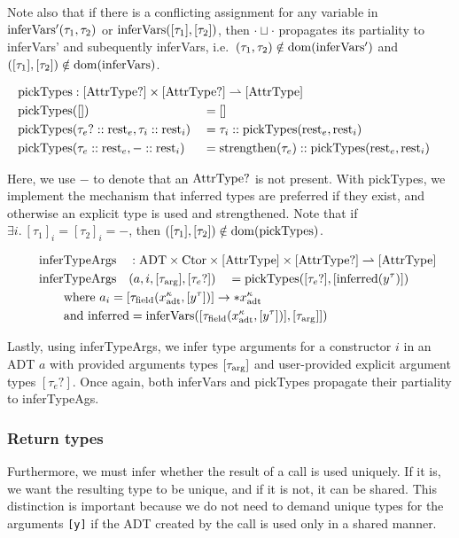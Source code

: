 Note also that if there is a conflicting assignment for any variable in $\mathrm{inferVars'}(\tau_1, \tau_2)$ or $\mathrm{inferVars}([\tau_1], [\tau_2])$, then $\cdot \sqcup \cdot$ propagates its partiality to inferVars' and subequently inferVars, i.e.\ $(\tau_1, \tau_2) \notin \mathrm{dom}(\mathrm{inferVars'})$ and $([\tau_1], [\tau_2]) \notin \mathrm{dom}(\mathrm{inferVars})$.

\newcommand{\pickTypes}{\mathrm{pickTypes}}

\begin{alignat*}{3}
	\pickTypes &: \mathrlap{[\AttrType?] \times [\AttrType?] \rightharpoonup [\AttrType]} \\
	\pickTypes&([]) &&= [] \\
	\pickTypes&(\tau_e? :: \rest_e, \tau_i :: \rest_i) &&= \tau_i :: \pickTypes(\rest_e, \rest_i) \\
	\pickTypes&(\tau_e :: \rest_e, - :: \rest_i) &&= \strengthen(\tau_e) :: \pickTypes(\rest_e, \rest_i) \\
\end{alignat*}

Here, we use $-$ to denote that an $\mathrm{AttrType}?$ is not present.
With pickTypes, we implement the mechanism that inferred types are preferred if they exist, and otherwise an explicit type is used and strengthened. Note that if $\exists i.\ [\tau_1]_i = [\tau_2]_i = -$, then $([\tau_1], [\tau_2]) \notin \dom(\pickTypes)$.

\newcommand{\inferTypeArgs}{\mathrm{inferTypeArgs}}

\begin{alignat*}{3}
	&\inferTypeArgs &&: \mathrlap{\ADT \times \Ctor \times [\AttrType] \times [\AttrType?] \rightharpoonup [\AttrType]} \\
	&\inferTypeArgs&&(a, i, [\tau_\arrg], [\tau_e?]) &&= \pickTypes([\tau_e?], [\mathrm{inferred}(y^\tau)])\\
	&\rebreak{\text{where } a_i = [\tau_\field(x^\kappa_\adt, [y^\tau])] \to *x^\kappa_\adt} \\
	&\rebreak{\text{and } \mathrm{inferred} = \inferVars([\tau_\field(x^\kappa_\adt, [y^\tau])], [\tau_\arrg]])}
\end{alignat*}

Lastly, using inferTypeArgs, we infer type arguments for a constructor $i$ in an ADT $a$ with provided arguments types $[\tau_{\mathrm{arg}}]$ and user-provided explicit argument types $[\tau_e?]$. Once again, both inferVars and pickTypes propagate their partiality to inferTypeAgs.

\subsubsection{Return types}
Furthermore, we must infer whether the result of a  call is used uniquely. If it is, we want the resulting type to be unique, and if it is not, it can be shared. This distinction is important because we do not need to demand unique types for the arguments \texttt{[y]} if the ADT created by the  call is used only in a shared manner.

